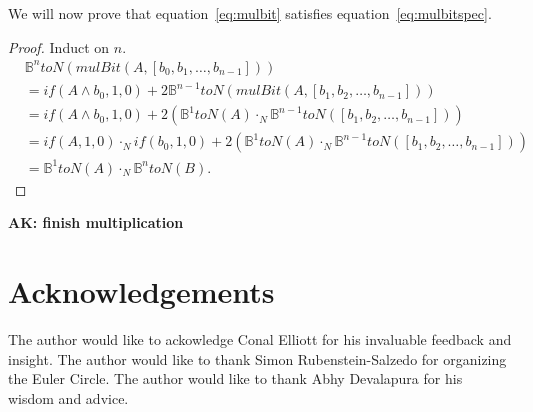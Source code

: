 \documentclass[14pt]{extarticle}  %
\newcommand{\atticus}[1]{\textbf{AK: #1}}
\theoremstyle{plain}
\theoremstyle{definition}
\theoremstyle{remark}
\begin{document}
We will now prove that equation~\ref{eq:mulbit} satisfies equation~\ref{eq:mulbitspec}.
\begin{proof}
  Induct on $n$.
  \begin{align}
    &\mathbb{B}^{n}toN(mulBit(A,[b_{0}, b_{1}, \ldots, b_{n-1}])) \\
    &= if(A \land b_{0}, 1, 0) + 2\mathbb{B}^{n-1}toN(mulBit(A, [b_{1}, b_{2}, \ldots, b_{n-1}])) \\
    &= if(A \land b_{0}, 1, 0) + 2(\mathbb{B}^{1}toN(A) \cdot_{N} \mathbb{B}^{n-1}toN([b_{1}, b_{2}, \ldots, b_{n-1}])) \\
    &= if(A,1,0)\cdot_{N} if(b_{0}, 1, 0) + 2(\mathbb{B}^{1}toN(A) \cdot_{N} \mathbb{B}^{n-1}toN([b_{1}, b_{2}, \ldots, b_{n-1}])) \\
    &= \mathbb{B}^{1}toN(A)\cdot_{N}\mathbb{B}^{n}toN(B).
\end{align}
\end{proof}
\atticus{finish multiplication}


\section*{Acknowledgements}
The author would like to ackowledge Conal Elliott for his invaluable feedback and insight. The author would like to thank Simon Rubenstein-Salzedo for organizing the Euler Circle.
The author would like to thank Abhy Devalapura for his wisdom and advice.


\end{document}
